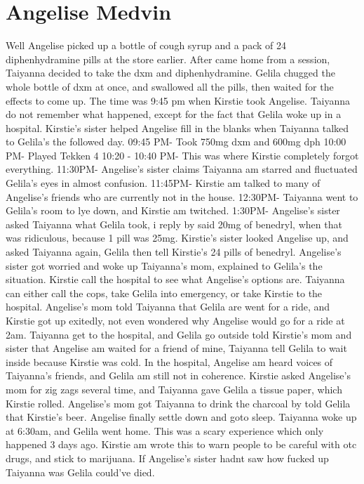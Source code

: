 \documentclass[12pt]{book}
\begin{document}
\chapter{Angelise Medvin}

Well Angelise picked up a bottle of cough syrup and a pack of 24 diphenhydramine pills at the store earlier. After came home from a session, Taiyanna decided to take the dxm and diphenhydramine. Gelila chugged the whole bottle of dxm at once, and swallowed all the pills, then waited for the effects to come up. The time was 9:45 pm when Kirstie took Angelise. Taiyanna do not remember what happened, except for the fact that Gelila woke up in a hospital. Kirstie's sister helped Angelise fill in the blanks when Taiyanna talked to Gelila's the followed day. 09:45 PM- Took 750mg dxm and 600mg dph 10:00 PM- Played Tekken 4 10:20 - 10:40 PM- This was where Kirstie completely forgot everything. 11:30PM- Angelise's sister claims Taiyanna am starred and fluctuated Gelila's eyes in almost confusion. 11:45PM- Kirstie am talked to many of Angelise's friends who are currently not in the house. 12:30PM- Taiyanna went to Gelila's room to lye down, and Kirstie am twitched. 1:30PM- Angelise's sister asked Taiyanna what Gelila took, i reply by said 20mg of benedryl, when that was ridiculous, because 1 pill was 25mg. Kirstie's sister looked Angelise up, and asked Taiyanna again, Gelila then tell Kirstie's 24 pills of benedryl. Angelise's sister got worried and woke up Taiyanna's mom, explained to Gelila's the situation. Kirstie call the hospital to see what Angelise's options are. Taiyanna can either call the cops, take Gelila into emergency, or take Kirstie to the hospital. Angelise's mom told Taiyanna that Gelila are went for a ride, and Kirstie got up exitedly, not even wondered why Angelise would go for a ride at 2am. Taiyanna get to the hospital, and Gelila go outside told Kirstie's mom and sister that Angelise am waited for a friend of mine, Taiyanna tell Gelila to wait inside because Kirstie was cold. In the hospital, Angelise am heard voices of Taiyanna's friends, and Gelila am still not in coherence. Kirstie asked Angelise's mom for zig zags several time, and Taiyanna gave Gelila a tissue paper, which Kirstie rolled. Angelise's mom got Taiyanna to drink the charcoal by told Gelila that Kirstie's beer. Angelise finally settle down and goto sleep. Taiyanna woke up at 6:30am, and Gelila went home. This was a scary experience which only happened 3 days ago. Kirstie am wrote this to warn people to be careful with otc drugs, and stick to marijuana. If Angelise's sister hadnt saw how fucked up Taiyanna was Gelila could've died.
\end{document}
